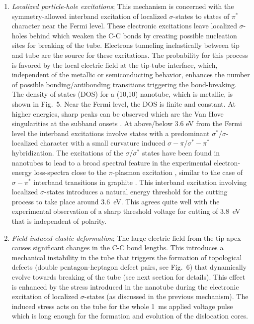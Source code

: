 \begin{multicols}{2}
\begin{enumerate}
\item{\it Localized particle-hole excitations}; This mechanism
is concerned with the symmetry-allowed interband excitation of
localized $\sigma$-states to states of $\pi^*$ character near the
Fermi level. These electronic excitations leave localized
$\sigma$-holes behind which weaken the C-C bonds by creating
possible nucleation sites for breaking of the tube. Electrons
tunneling inelastically between tip and tube are the source for
these excitations. The probability for this process is favored by
the local electric field at the tip-tube interface, which,
independent of the metallic or semiconducting behavior, enhances
the number of possible bonding/antibonding transitions triggering
the bond-breaking. The density of states (DOS) for a (10,10)
nanotube, which is metallic, is shown in Fig.~5. Near the Fermi
level, the DOS is finite and constant. At higher energies, sharp
peaks can be observed which are the Van Hove singularities at the
subband onsets \cite{stm_apa}. At above/below 3.6 eV from the
Fermi level the interband excitations involve states with a
predominant $\sigma^{\ast} $/$\sigma$-localized character with a
small curvature induced $\sigma -\pi $/$\sigma ^{\ast }-\pi ^{\ast
}$ hybridization. The excitations of the $\sigma $/$\sigma ^{\ast
}$ states have been found in nanotubes to lead to a broad spectral
feature in the experimental electron-energy loss-spectra close to
the $\pi$-plasmon excitation \cite{Pichler}, similar to the case
of $\sigma -\pi ^{\ast }$ interband transitions in graphite
\cite{book1}. This interband excitation involving localized
$\sigma $-states introduces a natural energy threshold for the
cutting process to take place around 3.6~eV. This agrees quite
well  with the experimental observation of a sharp threshold
voltage for cutting of 3.8~eV that is independent of polarity.

\item  {\it Field-induced elastic deformation};
The large electric field from the tip apex causes significant
changes in the C-C bond lengths.  This introduces a mechanical
instability  in the tube that triggers the formation of
topological defects (double pentagon-heptagon defect pairs, see
Fig.~6)\cite{SW,Vin} that dynamically evolve towards breaking of
the tube (see next section for details)\cite{jump_to_contact}.
This effect is enhanced by the stress introduced in the nanotube
during the electronic excitation of localized $\sigma$-states (as
discussed in the previous mechanism). The induced stress acts on
the tube for the whole 1~ms applied voltage pulse which is long
enough for the formation and evolution of the dislocation cores.
\end{enumerate}


\end{multicols}
